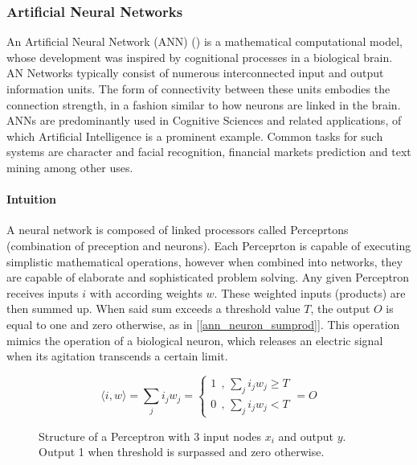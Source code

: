 \subsubsection{Artificial Neural Networks}
	\label{ann}
	An Artificial Neural Network (ANN) (\cite{mcculloch1943logical}) is a mathematical computational model, whose development was inspired by cognitional processes in a biological brain. AN Networks typically consist of numerous interconnected input and output information units. The form of connectivity between these units embodies the connection strength, in a fashion similar to how neurons are linked in the brain. ANNs are predominantly used in Cognitive Sciences and related applications, of which Artificial Intelligence is a prominent example. Common tasks for such systems are character and facial recognition, financial markets prediction and text mining among other uses.
	
	\paragraph{Intuition}
		A neural network is composed of linked processors called Perceprtons (combination of preception and neurons). Each Perceprton is capable of executing simplistic mathematical operations, however when combined into networks, they are capable of elaborate and sophisticated problem solving. Any given Perceptron receives inputs $ i $ with according weights $ w $. These weighted inputs (products) are then summed up. When said sum exceeds a threshold value $ T $, the output $ O $ is equal to one and zero otherwise, as in [\ref{ann_neuron_sumprod}]. This operation mimics the operation of a biological neuron, which releases an electric signal when its agitation transcends a certain limit.
	
	\begin{equation}
		\langle i,w \rangle = \sum_j i_j w_j = 
			\begin{cases}
				1 \ \ \text{,  } \sum_j i_j w_j \geq T \\
				0 \ \ \text{,  } \sum_j i_j w_j < T 
			\end{cases}
		 = O
		\label{ann_neuron_sumprod}
	\end{equation}
	
	\begin{figure}[h]
		\centering
		\captionsetup{width=0.8\textwidth}
		
		\caption[ANN Perceptron]{
			\footnotesize{
				Structure of a Perceptron with 3 input nodes $ x_i $ and output $ y $. Output 1 when threshold is surpassed and zero otherwise.
			}
		} 
		\label{ANN_percept}
	\end{figure}
	

